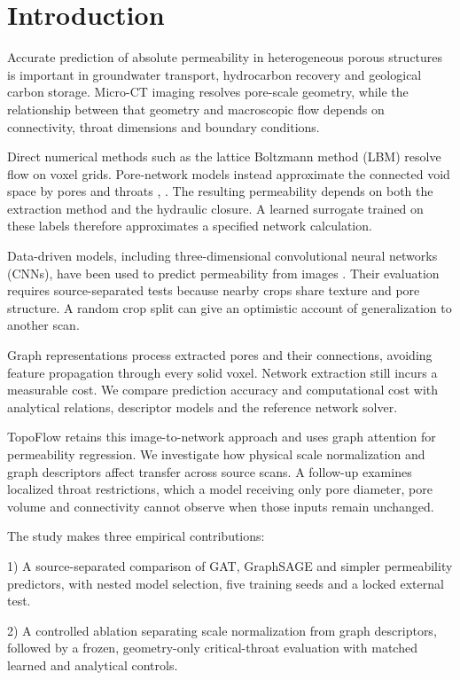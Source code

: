 \documentclass[a4paper]{svproc}
\begin{document}
\section{Introduction}

Accurate prediction of absolute permeability in heterogeneous porous structures is important in groundwater transport, hydrocarbon recovery and geological carbon storage. Micro-CT imaging resolves pore-scale geometry, while the relationship between that geometry and macroscopic flow depends on connectivity, throat dimensions and boundary conditions.

Direct numerical methods such as the lattice Boltzmann method (LBM) resolve flow on voxel grids. Pore-network models instead approximate the connected void space by pores and throats \cite{r1}, \cite{r2}. The resulting permeability depends on both the extraction method and the hydraulic closure. A learned surrogate trained on these labels therefore approximates a specified network calculation.

Data-driven models, including three-dimensional convolutional neural networks (CNNs), have been used to predict permeability from images \cite{r3}. Their evaluation requires source-separated tests because nearby crops share texture and pore structure. A random crop split can give an optimistic account of generalization to another scan.

Graph representations process extracted pores and their connections, avoiding feature propagation through every solid voxel. Network extraction still incurs a measurable cost. We compare prediction accuracy and computational cost with analytical relations, descriptor models and the reference network solver.

TopoFlow retains this image-to-network approach and uses graph attention for permeability regression. We investigate how physical scale normalization and graph descriptors affect transfer across source scans. A follow-up examines localized throat restrictions, which a model receiving only pore diameter, pore volume and connectivity cannot observe when those inputs remain unchanged.

The study makes three empirical contributions:

1) A source-separated comparison of GAT, GraphSAGE \cite{r4} and simpler permeability predictors, with nested model selection, five training seeds and a locked external test.

2) A controlled ablation separating scale normalization from graph descriptors, followed by a frozen, geometry-only critical-throat evaluation with matched learned and analytical controls.
\end{document}

